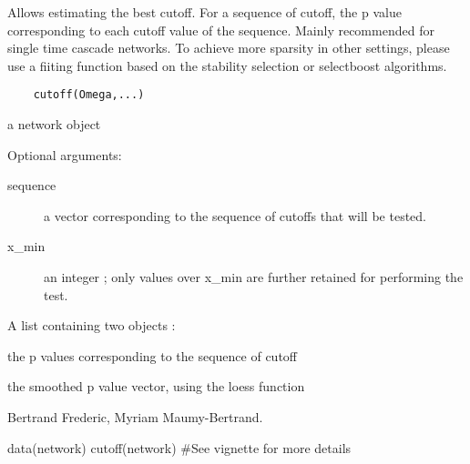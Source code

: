 \documentclass[a4paper]{book}
\begin{document}
%
\begin{Description}\relax
Allows estimating the best cutoff. For a sequence of cutoff, the p value corresponding to each cutoff value of the sequence. Mainly recommended for single time cascade networks. To achieve more sparsity in other settings, please use a fiiting function based on the stability selection or selectboost algorithms.
\end{Description}
%
\begin{Usage}
\begin{verbatim}
	cutoff(Omega,...)
\end{verbatim}
\end{Usage}
%
\begin{Arguments}
\begin{ldescription}
\item[\code{Omega}] a network object
\item[\code{...}] Optional arguments: 
\begin{description}

\item[sequence] a vector corresponding to the sequence of cutoffs that will be tested.
\item[x\_min] an integer ; only values over x\_min are further retained for performing the test.	

\end{description}



\end{ldescription}
\end{Arguments}
%
\begin{Value}
A list containing two objects :
\begin{ldescription}
\item[\code{p.value}] the p values corresponding to the sequence of cutoff
\item[\code{p.value.inter}] the smoothed p value vector, using the loess function
\end{ldescription}
\end{Value}
%
\begin{Author}\relax
Bertrand Frederic, Myriam Maumy-Bertrand.
\end{Author}
%
\begin{Examples}
\begin{ExampleCode}

		data(network)
		cutoff(network)
		#See vignette for more details

\end{ExampleCode}
\end{Examples}
\end{document}
